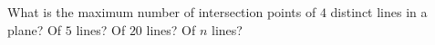 What is the maximum number of intersection points of $4$ distinct lines in a plane? Of $5$ lines? Of $20$ lines? Of $n$ lines?
